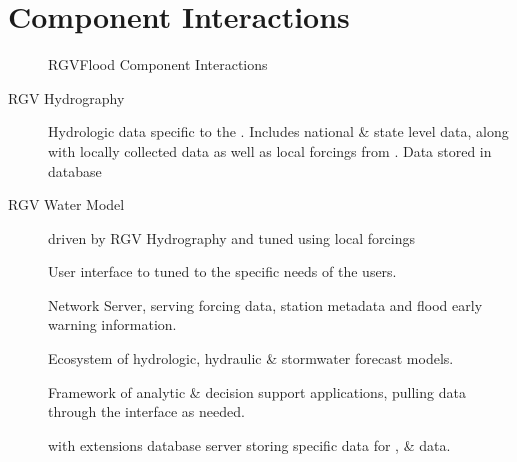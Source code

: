 \documentclass[letterpaper,12pt,english]{sphinxmanual}
\begin{document}
\chapter{Component Interactions}
\label{\detokenize{predevelopment/component-interactions/index:component-interactions}}\label{\detokenize{predevelopment/component-interactions/index::doc}}
\begin{figure}[htbp]
\centering
\capstart

\noindent{}
\caption{RGVFlood Component Interactions}\label{\detokenize{predevelopment/component-interactions/index:id1}}\end{figure}
\begin{description}
\item[{RGV Hydrography}] \leavevmode
\sphinxAtStartPar
Hydrologic data specific to the . Includes national \& state level data, along with locally collected data as well as local forcings from . Data stored in   database

\item[{RGV Water Model}] \leavevmode
\sphinxAtStartPar
{} driven by RGV Hydrography and tuned using local forcings

\item[{}] \leavevmode
\sphinxAtStartPar
User interface to  tuned to the specific needs of the  users.

\item[{}] \leavevmode
\sphinxAtStartPar
{} Network Server, serving forcing data, station metadata and flood early warning information.

\item[{}] \leavevmode
\sphinxAtStartPar
Ecosystem of hydrologic, hydraulic \& stormwater forecast models.

\item[{}] \leavevmode
\sphinxAtStartPar
Framework of  analytic \& decision support applications, pulling data through the   interface as needed.

\item[{}] \leavevmode
\sphinxAtStartPar
{} with  extensions database server storing  specific data for ,  \&  data.


\end{description}
\end{document}
